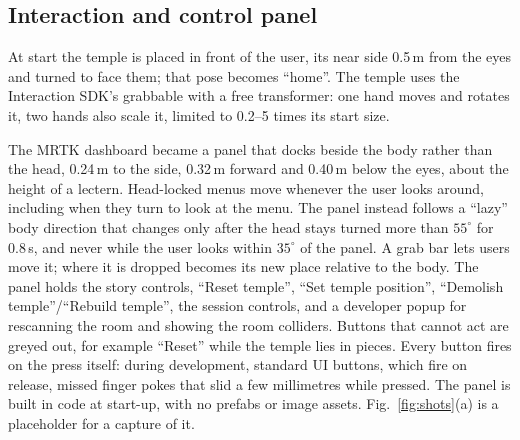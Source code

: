 \documentclass[conference]{IEEEtran}
\begin{document}
\subsection{Interaction and control panel}
At start the temple is placed in front of the user, its near side 0.5\,m from the eyes and turned to face them; that pose becomes ``home''. The temple uses the Interaction SDK's grabbable with a free transformer: one hand moves and rotates it, two hands also scale it, limited to 0.2--5 times its start size.

The MRTK dashboard became a panel that docks beside the body rather than the head, 0.24\,m to the side, 0.32\,m forward and 0.40\,m below the eyes, about the height of a lectern. Head-locked menus move whenever the user looks around, including when they turn to look at the menu. The panel instead follows a ``lazy'' body direction that changes only after the head stays turned more than $55^\circ$ for 0.8\,s, and never while the user looks within $35^\circ$ of the panel. A grab bar lets users move it; where it is dropped becomes its new place relative to the body. The panel holds the story controls, ``Reset temple'', ``Set temple position'', ``Demolish temple''/``Rebuild temple'', the session controls, and a developer popup for rescanning the room and showing the room colliders. Buttons that cannot act are greyed out, for example ``Reset'' while the temple lies in pieces. Every button fires on the press itself: during development, standard UI buttons, which fire on release, missed finger pokes that slid a few millimetres while pressed. The panel is built in code at start-up, with no prefabs or image assets. Fig.~\ref{fig:shots}(a) is a placeholder for a capture of it.
\end{document}
